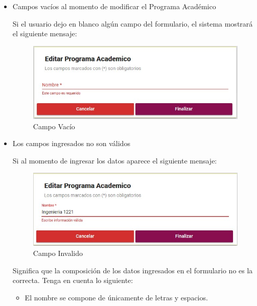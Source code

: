             \begin{itemize}
                \item Campos vacíos al momento de modificar el Programa Académico

                    Si el usuario dejo en blanco algún campo del formulario, el sistema mostrará el siguiente mensaje:

                    \begin{figure}[!hbtp]
                    \centering
                    \hypertarget{vacio}{\includegraphics[width=0.7\linewidth]{images/SP3/Vacio}}
                    \caption{Campo Vacío}
                    \label{vacio}
                    \end{figure}

                \item Los campos ingresados no son válidos

                    Si al momento de ingresar los datos aparece el siguiente mensaje:

                     \begin{figure}[!hbtp]
                    \centering
                    \hypertarget{invalido}{\includegraphics[width=0.7\linewidth]{images/SP3/Invalida}}
                    \caption{Campo Invalido}
                    \label{invalido}
                    \end{figure}


                    Significa que la composición de los datos ingresados en el formulario no es la correcta. Tenga en cuenta lo siguiente:

                    \begin{itemize}
                        \item El nombre se compone de únicamente de letras y espacios.


\end{itemize}
\end{itemize}
